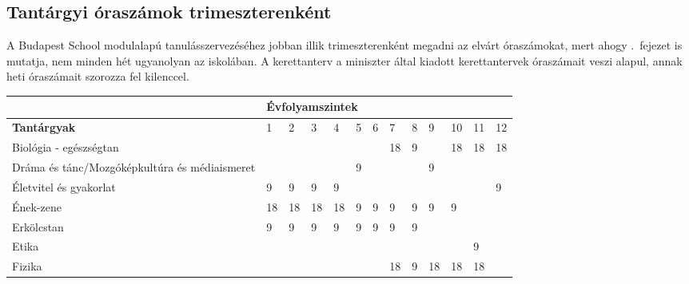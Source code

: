 \subsection{Tantárgyi óraszámok trimeszterenként}
A Budapest School modulalapú tanulásszervezéséhez jobban illik trimeszterenként megadni az elvárt óraszámokat, mert ahogy .~fejezet is mutatja, nem minden hét ugyanolyan az iskolában. A kerettanterv a miniszter által kiadott kerettantervek óraszámait veszi alapul, annak heti óraszámait szorozza fel kilenccel. 

\begin{landscape}
\begin{table}[]
  \begin{tabular}{l|l|l|l|l|l|l|l|l|l|l|l|l}
  
                                                        & \multicolumn{12}{l}{\textbf{Évfolyamszintek}}                                                                                                                                                           \\ \hline
    \textbf{Tantárgyak}                                          & 1                                     & 2           & 3           & 4           & 5           & 6           & 7           & 8           & 9           & 10          & 11          & 12          \\ \hline
    Biológia - egészségtan                              &     &     &     &     &     &     & 18  & 9   &     & 18  & 18  & 18  \\\hline
    Dráma és tánc/Mozgóképkultúra és médiaismeret       &     &     &     &     & 9   &     &     &     & 9   &     &     &     \\ \hline
    Életvitel és gyakorlat                              & 9   & 9   & 9   & 9   &     &     &     &     &     &     &     & 9   \\\hline
    Ének-zene                                           & 18  & 18  & 18  & 18  & 9   & 9   & 9   & 9   & 9   & 9   &     &     \\\hline
    Erkölcstan                                          & 9   & 9   & 9   & 9   & 9   & 9   & 9   & 9   &     &     &     &     \\\hline
    Etika                                               &     &     &     &     &     &     &     &     &     &     & 9   &     \\\hline
    Fizika                                              &     &     &     &     &     &     & 18  & 9   & 18  & 18  & 18  &     \\\hline

\end{tabular}
\end{table}
\end{landscape}
